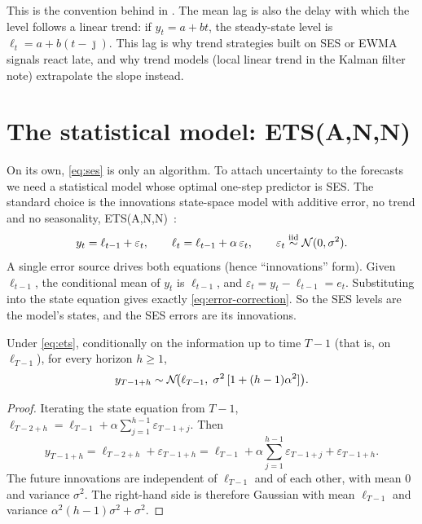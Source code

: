\documentclass[11pt,a4paper]{article}
\begin{document}
This is the convention behind  in
. The mean lag is also the delay with which the level
follows a linear trend: if $y_t = a + bt$, the steady-state level is
$\ell_t = a + b(t-\bar{\jmath})$. This lag is why trend strategies built on SES
or EWMA signals react late, and why trend models (local linear trend in the
Kalman filter note) extrapolate the slope instead.

\section{The statistical model: ETS(A,N,N)}

On its own, \eqref{eq:ses} is only an algorithm. To attach uncertainty to the
forecasts we need a statistical model whose optimal one-step predictor is SES.
The standard choice is the innovations state-space model with additive error,
no trend and no seasonality, ETS(A,N,N)~\cite{hyndman2008}:
\begin{equation}\label{eq:ets}
  y_t = \ell_{t-1} + \varepsilon_t,\qquad
  \ell_t = \ell_{t-1} + \alpha\,\varepsilon_t,\qquad
  \varepsilon_t \overset{\text{iid}}{\sim} \mathcal{N}(0,\sigma^2).
\end{equation}
A single error source drives both equations (hence ``innovations'' form).
Given $\ell_{t-1}$, the conditional mean of $y_t$ is $\ell_{t-1}$, and
$\varepsilon_t = y_t-\ell_{t-1} = e_t$. Substituting into the state equation gives
exactly \eqref{eq:error-correction}. So the SES levels are the model's
states, and the SES errors are its innovations.

\begin{theorem}\label{thm:forecast}
Under \eqref{eq:ets}, conditionally on the information up to time $T-1$
(that is, on $\ell_{T-1}$), for every horizon $h\ge 1$,
\[
  y_{T-1+h} \sim \mathcal{N}\!\big(\ell_{T-1},\; \sigma^2\,[1+(h-1)\alpha^2]\big).
\]
\end{theorem}
\begin{proof}
Iterating the state equation from $T-1$,
$\ell_{T-2+h} = \ell_{T-1} + \alpha\sum_{j=1}^{h-1}\varepsilon_{T-1+j}$. Then
\[
  y_{T-1+h} = \ell_{T-2+h} + \varepsilon_{T-1+h}
            = \ell_{T-1} + \alpha\sum_{j=1}^{h-1}\varepsilon_{T-1+j} + \varepsilon_{T-1+h}.
\]
The future innovations are independent of $\ell_{T-1}$ and of each other, with
mean $0$ and variance $\sigma^2$. The right-hand side is therefore Gaussian with mean
$\ell_{T-1}$ and variance $\alpha^2(h-1)\sigma^2+\sigma^2$.
\end{proof}
\end{document}
